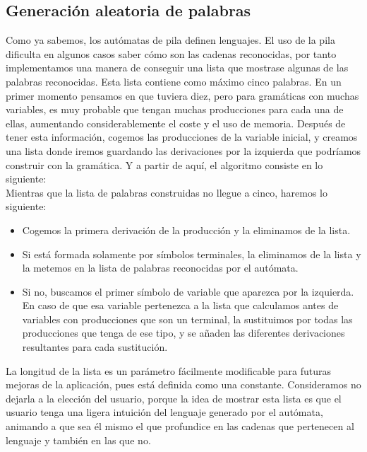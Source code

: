 \documentclass[12pt,a4paper,spanish]{book}
\begin{document}
\subsection{Generaci\'on aleatoria de palabras}
Como ya sabemos, los aut\'omatas de pila definen lenguajes. El uso de la pila dificulta en algunos casos saber c\'omo son las cadenas reconocidas, por tanto implementamos una manera de conseguir una lista que mostrase algunas de las palabras reconocidas.
Esta lista contiene como m\'aximo cinco palabras. En un primer momento pensamos en que tuviera diez, pero para gram\'aticas con muchas variables, es muy probable que tengan muchas producciones para cada una de ellas, aumentando considerablemente el coste y el uso de memoria.
Despu\'es de tener esta informaci\'on, cogemos las producciones de la variable inicial, y creamos una lista donde iremos guardando las derivaciones por la izquierda que podr\'iamos construir con la gram\'atica. Y a partir de aqu\'i, el algoritmo consiste en lo siguiente:\\
\newline
Mientras que la lista de palabras construidas no llegue a cinco, haremos lo siguiente:
\begin{itemize}
\item Cogemos la primera derivaci\'on de la producci\'on y la eliminamos de la lista.
\item Si est\'a formada solamente por s\'imbolos terminales, la eliminamos de la lista y la metemos en la lista de palabras reconocidas por el aut\'omata. 
\item Si no, buscamos el primer s\'imbolo de variable que aparezca por la izquierda. En caso de que esa variable pertenezca a la lista que calculamos antes de variables con producciones que son un terminal, la sustituimos por todas las producciones que tenga de ese tipo, y se a\~naden las diferentes derivaciones resultantes para cada sustituci\'on.
\end{itemize}
La longitud de la lista es un par\'ametro f\'acilmente modificable para futuras mejoras de la aplicaci\'on, pues est\'a definida como una constante. Consideramos no dejarla a la elecci\'on del usuario, porque la idea de mostrar esta lista es que el usuario tenga una ligera intuici\'on del lenguaje generado por el aut\'omata, animando a que sea \'el mismo el que profundice en las cadenas que pertenecen al lenguaje y tambi\'en en las que no.
\end{document}
